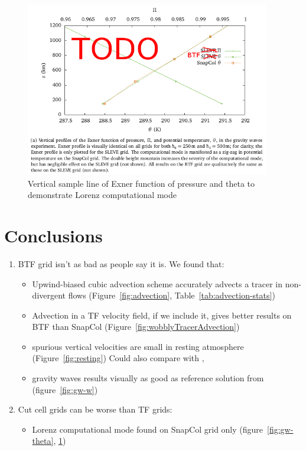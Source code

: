 \documentclass[a4paper]{article}
\begin{document}
\begin{figure}
	\includegraphics[height=3in]{gw-exner-theta.png}
%
	\caption{Vertical sample line of Exner function of pressure and theta to demonstrate Lorenz computational mode}
	\label{fig:gw-exner-theta}
\end{figure}

\section{Conclusions}
\begin{enumerate}
	\item BTF grid isn't as bad as people say it is.  We found that:
	\begin{itemize}
		\item Upwind-biased cubic advection scheme accurately advects a tracer in non-divergent flows (Figure~\ref{fig:advection}, Table~\ref{tab:advection-stats})
		\item Advection in a TF velocity field, if we include it, gives better results on BTF than SnapCol (Figure~\ref{fig:wobblyTracerAdvection})
		\item spurious vertical velocities are small in resting atmosphere (Figure~\ref{fig:resting})  Could also compare with \textcite{zaengl2012}, \textcite{good2014}
		\item gravity waves results visually as good as reference solution from \textcite{melvin2010} (figure~\ref{fig:gw-w})
	\end{itemize}

	\item Cut cell grids can be worse than TF grids:
	\begin{itemize}
		\item Lorenz computational mode found on SnapCol grid only (figure~\ref{fig:gw-theta}, \ref{fig:gw-exner-theta})
	\end{itemize}
\end{enumerate}
\end{document}
